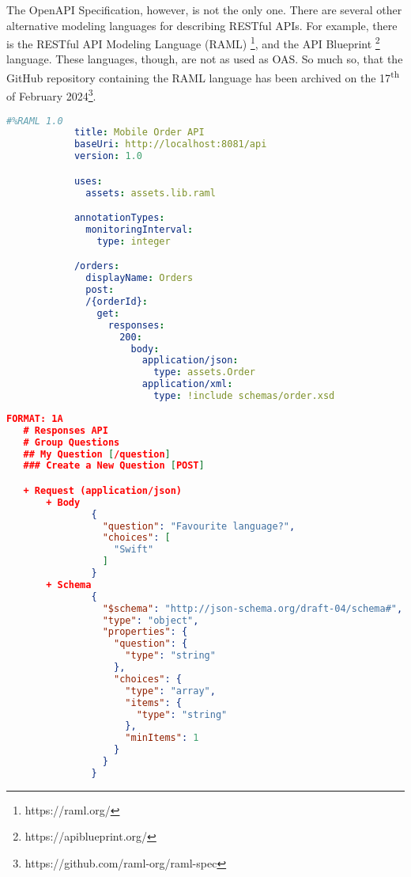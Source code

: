 \noindent The OpenAPI Specification, however, is not the only one.
There are several other alternative modeling languages for describing RESTful APIs.
For example, there is the RESTful API Modeling Language (RAML) \footnote{https://raml.org/}, and the API Blueprint \footnote{https://apiblueprint.org/} language.
These languages, though, are not as used as OAS\@.
So much so, that the GitHub repository containing the RAML language has been archived on the 17\textsuperscript{th} of February 2024\footnote{https://github.com/raml-org/raml-spec}.

\begin{lstlisting}[label={lst:raml},caption={Example of a RAML document},captionpos=b,language=yaml]
            #%RAML 1.0
            title: Mobile Order API
            baseUri: http://localhost:8081/api
            version: 1.0

            uses:
              assets: assets.lib.raml

            annotationTypes:
              monitoringInterval:
                type: integer

            /orders:
              displayName: Orders
              post:
              /{orderId}:
                get:
                  responses:
                    200:
                      body:
                        application/json:
                          type: assets.Order
                        application/xml:
                          type: !include schemas/order.xsd
\end{lstlisting}

\begin{lstlisting}[label={lst:api-blueprint},caption={Example of an API Blueprint document},captionpos=b,language=json]
   FORMAT: 1A
   # Responses API
   # Group Questions
   ## My Question [/question]
   ### Create a New Question [POST]

   + Request (application/json)
       + Body
               {
                 "question": "Favourite language?",
                 "choices": [
                   "Swift"
                 ]
               }
       + Schema
               {
                 "$schema": "http://json-schema.org/draft-04/schema#",
                 "type": "object",
                 "properties": {
                   "question": {
                     "type": "string"
                   },
                   "choices": {
                     "type": "array",
                     "items": {
                       "type": "string"
                     },
                     "minItems": 1
                   }
                 }
               }
\end{lstlisting}
